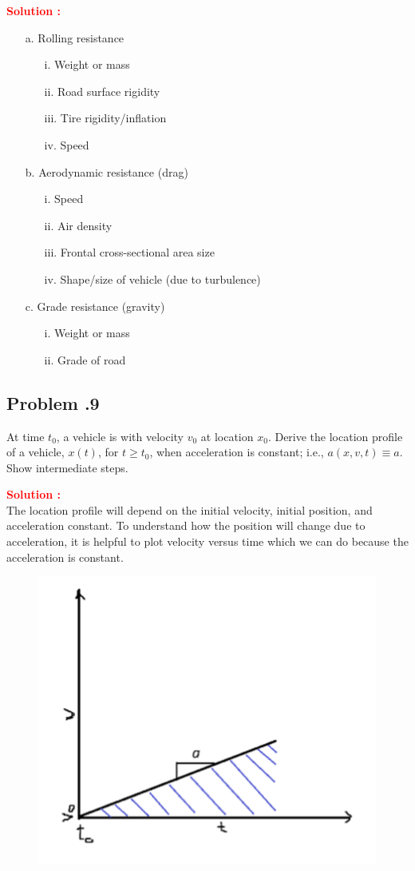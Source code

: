 \documentclass[12pt]{article}
\newcommand{\customsubsection}[1]{
  \subsection*{Problem \thesection.#1}
}
\begin{document}
\textbf{\textcolor{red}{Solution :}} \\
\begin{itemize}
    \item[a.] Rolling resistance
    \begin{itemize}
        \item[i.] Weight or mass
        \item[ii.] Road surface rigidity
        \item[iii.] Tire rigidity/inflation
        \item[iv.] Speed
    \end{itemize}
    \item[b.] Aerodynamic resistance (drag)
    \begin{itemize}
        \item[i.] Speed
        \item[ii.] Air density
        \item[iii.] Frontal cross-sectional area size
        \item[iv.] Shape/size of vehicle (due to turbulence)
    \end{itemize}
    \item[c.] Grade resistance (gravity)
    \begin{itemize}
        \item[i.] Weight or mass
        \item[ii.] Grade of road
    \end{itemize}
\end{itemize}

\newpage

\customsubsection{9}
At time \( t_0 \), a vehicle is with velocity \( v_0 \) at location \( x_0 \). Derive the location profile of a vehicle, \( x(t) \), for \( t \ge t_0 \), when acceleration is constant; i.e., \( a(x, v, t) \equiv a \). Show intermediate steps.


\textbf{\textcolor{red}{Solution :}} \\
The location profile will depend on the initial velocity, initial position, and acceleration constant. To understand how the position will change due to acceleration, it is helpful to plot velocity versus time which we can do because the acceleration is constant.
\begin{figure}[h!]
    \centering
    \includegraphics[width=0.5\linewidth]{img/P4_5.png}
\end{figure}
 
\end{document}
